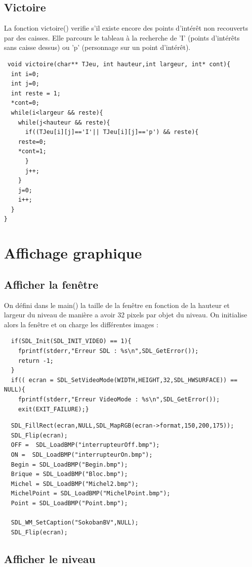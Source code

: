\documentclass{article}
\begin{document}
\subsection{Victoire}
La fonction victoire() verifie s'il existe encore des points d'intérêt non recouverts par des caisses.
Elle parcours le tableau à la recherche de 'I' (points d'intérêts sans caisse dessus) ou 'p' (personnage sur un point d'intérêt).
\begin{verbatim}
 void victoire(char** TJeu, int hauteur,int largeur, int* cont){
  int i=0;
  int j=0;
  int reste = 1;
  *cont=0;
  while(i<largeur && reste){
    while(j<hauteur && reste){
      if((TJeu[i][j]=='I'|| TJeu[i][j]=='p') && reste){
	reste=0;
	*cont=1;
      }
      j++;
    }
    j=0;
    i++;
  }
}
\end{verbatim}

\section{Affichage graphique}

\subsection{Afficher la fenêtre}

On défini dans le main() la taille de la fenêtre en fonction de la hauteur et largeur du niveau de manière a avoir 32 pixels par objet du niveau.
On initialise alors la fenêtre et on charge les différentes images :
\begin{verbatim}
  if(SDL_Init(SDL_INIT_VIDEO) == 1){
    fprintf(stderr,"Erreur SDL : %s\n",SDL_GetError());
    return -1;
  }
  if(( ecran = SDL_SetVideoMode(WIDTH,HEIGHT,32,SDL_HWSURFACE)) == NULL){
    fprintf(stderr,"Erreur VideoMode : %s\n",SDL_GetError());
    exit(EXIT_FAILURE);}
\end{verbatim}

\begin{verbatim}
  SDL_FillRect(ecran,NULL,SDL_MapRGB(ecran->format,150,200,175));
  SDL_Flip(ecran);
  OFF =  SDL_LoadBMP("interrupteurOff.bmp");
  ON =  SDL_LoadBMP("interrupteurOn.bmp");
  Begin = SDL_LoadBMP("Begin.bmp");
  Brique = SDL_LoadBMP("Bloc.bmp");
  Michel = SDL_LoadBMP("Michel2.bmp");
  MichelPoint = SDL_LoadBMP("MichelPoint.bmp");
  Point = SDL_LoadBMP("Point.bmp");

  SDL_WM_SetCaption("SokobanBV",NULL);
  SDL_Flip(ecran);
\end{verbatim}


\subsection{Afficher le niveau}
\end{document}
